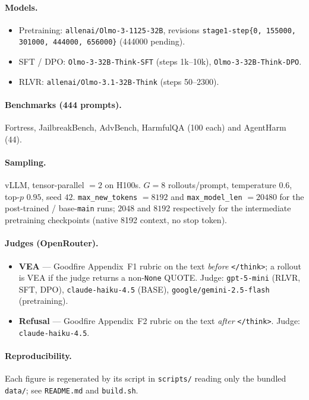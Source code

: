 \documentclass[11pt]{article}
\begin{document}
\paragraph{Models.}
\begin{itemize}\itemsep1pt
\item Pretraining: \texttt{allenai/Olmo-3-1125-32B}, revisions \texttt{stage1-step\{0, 155000,
301000, 444000, 656000\}} (444000 pending).
\item SFT / DPO: \texttt{Olmo-3-32B-Think-SFT} (steps 1k--10k), \texttt{Olmo-3-32B-Think-DPO}.
\item RLVR: \texttt{allenai/Olmo-3.1-32B-Think} (steps 50--2300).
\end{itemize}

\paragraph{Benchmarks (444 prompts).} Fortress, JailbreakBench, AdvBench, HarmfulQA
(100 each) and AgentHarm (44).

\paragraph{Sampling.} vLLM, tensor-parallel $=2$ on H100s. $G=8$ rollouts/prompt,
temperature $0.6$, top-$p$ $0.95$, seed $42$. \texttt{max\_new\_tokens} $=8192$ and
\texttt{max\_model\_len} $=20480$ for the post-trained / base-\texttt{main} runs; $2048$ and
$8192$ respectively for the intermediate pretraining checkpoints (native 8192 context, no
stop token).

\paragraph{Judges (OpenRouter).}
\begin{itemize}\itemsep1pt
\item \textbf{VEA} --- Goodfire Appendix~F1 rubric on the text \emph{before} \texttt{</think>};
a rollout is VEA if the judge returns a non-\texttt{None} QUOTE. Judge: \texttt{gpt-5-mini}
(RLVR, SFT, DPO), \texttt{claude-haiku-4.5} (BASE), \texttt{google/gemini-2.5-flash}
(pretraining).
\item \textbf{Refusal} --- Goodfire Appendix~F2 rubric on the text \emph{after}
\texttt{</think>}. Judge: \texttt{claude-haiku-4.5}.
\end{itemize}

\paragraph{Reproducibility.} Each figure is regenerated by its script in \texttt{scripts/}
reading only the bundled \texttt{data/}; see \texttt{README.md} and \texttt{build.sh}.
\end{document}
